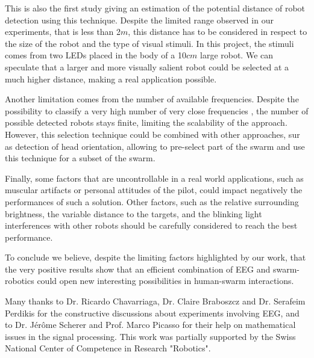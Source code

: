 \documentclass{svmult}
\begin{document}
This is also the first study giving an estimation of the potential distance of robot detection using this technique.
Despite the limited range observed in our experiments, that is less than 2$m$, this distance has to be considered in respect to the size of the robot and the type of visual stimuli.
In this project, the stimuli comes from two LEDs placed in the body of a 10$cm$ large robot. 
We can speculate that a larger and more visually salient robot could be selected at a much higher distance, making a real application possible.


Another limitation comes from the number of available frequencies.
Despite the possibility to classify a very high number of very close frequencies \cite{SSVEPfiability}, the number of possible detected robots stays finite, limiting the scalability of the approach. 
However, this selection technique could be combined with other approaches, sur as detection of head orientation, allowing to pre-select part of the swarm and use this technique for a subset of the swarm.


Finally, some factors that are uncontrollable in a real world applications, such as muscular artifacts or personal attitudes of the pilot, could impact negatively the performances of such a solution.
Other factors, such as the relative surrounding brightness, the variable distance to the targets, and the blinking light interferences with other robots should be carefully considered to reach the best performance.


To conclude we believe, despite the limiting factors highlighted by our work, that the very positive results show that an efficient combination of EEG and swarm-robotics could open new interesting possibilities in human-swarm interactions.\\


\begin{acknowledgement}
Many thanks to Dr. Ricardo Chavarriaga, Dr. Claire Braboszcz and Dr. Serafeim Perdikis for the constructive discussions about experiments involving EEG, and to Dr. J\'er\^ome Scherer and Prof. Marco Picasso for their help on mathematical issues in the signal processing. This work was partially supported by the Swiss National Center of Competence in Research "Robotics".
\end{acknowledgement}


\end{document}
